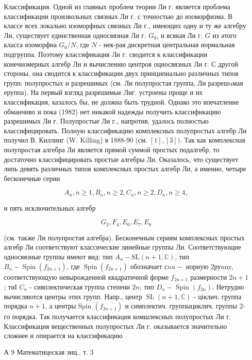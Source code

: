 \documentclass[10pt]{article}
\begin{document}
Классификация. Одной из главных проблем теории Ли г. является проблема классификации произвольных связных Ли г. с точностью до изоморфизма. В классе всех локально изоморфных связных Ли г., имеющих одну и ту же алгебру Ли, существует единственная односвязная Ли г. $G_{0}$, и всякая Ли г. $G$ из әтого класса изоморфна $G_{0} / N$, где $N$ - нек-рая дискретная центральная нормальная подгруппа. Поэтому классификация Ли г. сводится к классификации конечномерных алгебр Ли и вычислению центров оцносвязных Ли г. С другой стороны, она сводится к классификации двух принципиально различных типов групп: полупростых и разрешимых (см. Ли полупростая группа, Ли разрешuмая еруппа). На первый взгляд разрешимые Лиг. устроены проще и их классификация, казалось бы, не должна быть трудной. Однако это впечатление обманчиво и пока (1982) нет никакой надежды получить классификацию разрешимых Ли г. Полупростые Ли г., напротив, удалось полностью классифицировать. Полную классификацию комплексных полупростых алгебр Ли получил В. Киллинг (W. Killing) в 1888-90 (см. $[1],[3])$. Так как комплексная полупростая алгебра Ли является прямой суммой простых подалгебр, то достаточно классифицировать простые алгебры Ли. Оказалось, что существует липь девять различных типов комплексных простых алгебр Ли, а именно, четыре бесконечные серии



\[

A_{n}, n \geqslant 1, B_{n}, n \geqslant 2, C_{n}, n \geqslant 2, D_{n}, n \geqslant 4,

\]



и пять исключительных алгебр



\[

G_{2}, F_{4}, E_{6}, E_{7}, E_{8}

\]



(см. также Ли полупростая алгебра). Бесконечным сериям комплексных простых алгебр Ли соответствуют классические линейные группы Ли. Соответствующие односвязные группы имеют вид: тип $A_{n}-\mathrm{SL}(n+1, \mathbb{C})$, тип $B_{n}-\operatorname{Spin}\left(f_{2 n+1}\right)$, где $\operatorname{Spin}\left(f_{2 n+1}\right)$ обозначает $с n u-$ норную 2руnny, соответствующую невырожденной квадратичной форме $f_{2 n+1}$ размерности $2 n+1$; тиІ $C_{n}$ - сияплектическая группа степени $2 n$; тип $D_{n}-$ Spin $\left(f_{2 n}\right)$. Нетрудно вычисляются центры этих групп. Напр., центр $\operatorname{SL}(n+1, \mathbb{C})$ - ціклич. группа порядка $n+1$, а центры Spin $\left(f_{2 n+1}\right)$ и симплектич. группыциклич. группы 2-го порядка. Так получается классификация комшлексных полупростых Ли г. Классификация вещественных полупростых Ли г. оказывается значительно сложнее и опирается на классификацию



А 9 Математицеская энц., т. 3
\end{document}
